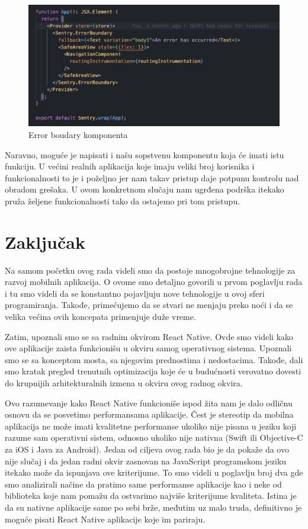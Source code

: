 \documentclass[12pt,oneside]{memoir}
\begin{document}
\begin{figure}[h!]
\centering
\includegraphics[scale=0.5]{docs/images/chapterSeven/ErrorBoundary.png}
\caption{Error boudary komponenta}
\label{fig:errorBoundary}
\end{figure}

Naravno, moguće je napisati i našu sopstvenu komponentu koja će imati istu funkciju. U većini realnih aplikacija koje imaju veliki broj korisnika i funkcionalnosti to je i poželjno jer nam takav pristup daje potpunu kontrolu nad obradom grešaka. U ovom konkretnom slučaju nam ugrđena podrška itekako pruža željene funkcionalnosti tako da ostajemo pri tom pristupu.

\chapter{Zaključak}

Na samom početku ovog rada videli smo da postoje mnogobrojne tehnologije za razvoj mobilnih aplikacija. O ovome smo detaljno govorili u prvom poglavlju rada i tu smo videli da se konstantno pojavljuju nove tehnologije u ovoj sferi programiranja. Takođe, primećujemo da se stvari ne menjaju preko noći i da se velika većina ovih koncepata primenjuje duže vreme.

Zatim, upoznali smo se sa radnim okvirom React Native. Ovde smo videli kako ove aplikacije zaista funkcionišu u okviru samog operativnog sistema. Upoznali smo se sa konceptom mosta, sa njegovim prednostima i nedostacima. Takođe, dali smo kratak pregled trenutnih optimizacija koje će u budućnosti verovatno dovesti do krupnijih arhitekturalnih izmena u okviru ovog radnog okvira. 

Ovo razumevanje kako React Native funkcioniše ispod žita nam je dalo odličnu osnovu da se posvetimo performansama aplikacije. Čest je stereotip da mobilna aplikacija ne može imati kvalitetne performanse ukoliko nije pisana u jeziku koji razume sam operativni sistem, odnosno ukoliko nije nativna (Swift ili Objective-C za iOS i Java za Android). Jedan od ciljeva ovog rada bio je da pokaže da ovo nije slučaj i da jedan radni okvir zasnovan na JavaScript programskom jeziku itekako može da ispunjava ove kriterijume. To smo videli u poglavlju broj dva gde smo analizirali načine da pratimo same performanse aplikacije kao i neke od biblioteka koje nam pomažu da ostvarimo najviše kriterijume kvaliteta. Istina je da su nativne aplikacije same po sebi brže, međutim uz malo truda, definitivno je moguće pisati React Native aplikacije koje im pariraju.
\end{document}
